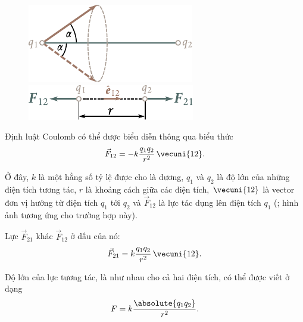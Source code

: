 \begin{figure}[!htb]
	\begin{minipage}[t]{0.5\linewidth}
		\begin{center}
			\includegraphics[scale=1]{figures/ch_01/fig_1_2.pdf}
			\caption[]{}
			\label{fig:1_2}
		\end{center}
	\end{minipage}
	\hspace{-0.05cm}
	\begin{minipage}[t]{0.5\linewidth}
		\begin{center}
			\includegraphics[scale=1]{figures/ch_01/fig_1_3.pdf}
			\caption[]{}
			\label{fig:1_3}
		\end{center}
	\end{minipage}
\vspace{-0.4cm}
\end{figure}

Định luật Coulomb có thể được biểu diễn thông qua biểu thức
\begin{equation}\label{eq:1_2}
	\vec{F}_{12} = -k \frac{q_1 q_2}{r^2}\,\vecuni{12}.
\end{equation}

\noindent
Ở đây, $k$ là một hằng số tỷ lệ được cho là dương, $q_1$ và $q_2$ là độ lớn của những điện tích tương tác, $r$ là khoảng cách giữa các điện tích, $\vecuni{12}$ là vector đơn vị hướng từ điện tích $q_1$ tới $q_2$ và $\vec{F}_{12}$ là lực tác dụng lên điện tích $q_1$ (; hình ảnh tương ứng cho trường hợp này).

Lực $\vec{F}_{21}$ khác $\vec{F}_{12}$ ở dấu của nó:
\begin{equation}\label{eq:1_3}
	\vec{F}_{21} = k \frac{q_1 q_2}{r^2}\,\vecuni{12}.
\end{equation}

Độ lớn của lực tương tác, là như nhau cho cả hai điện tích, có thể được viết ở dạng
\begin{equation}\label{eq:1_4}
	F = k \frac{\absolute{q_1 q_2}}{r^2}.
\end{equation}

